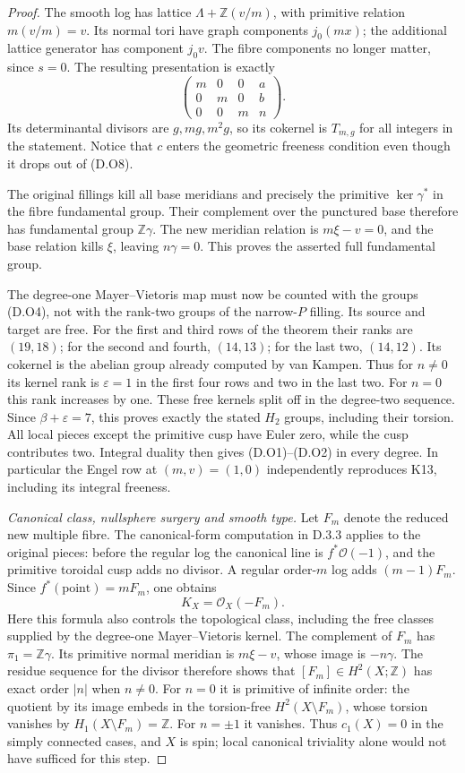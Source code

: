 \begin{proof}
The smooth log has lattice $\Lambda+\mathbb Z(v/m)$,
with primitive relation $m(v/m)=v$.
Its normal tori have graph components $j_0(mx)$;
the additional lattice generator has component $j_0v$.
The fibre components no longer matter, since $s=0$.
The resulting presentation is exactly
\[
  \begin{pmatrix}
    m&0&0&a\\0&m&0&b\\0&0&m&n
  \end{pmatrix}.
 \tag{D.O8}
\]
Its determinantal divisors are $g,mg,m^2g$,
so its cokernel is $T_{m,g}$ for all integers in the
statement. Notice that $c$ enters the geometric
freeness condition even though it drops out of (D.O8).

The original fillings kill all base meridians and
precisely the primitive $\ker\gamma^*$ in the fibre
fundamental group. Their complement over the punctured
base therefore has fundamental group $\mathbb Z\gamma$.
The new meridian relation is $m\xi-v=0$, and the base
relation kills $\xi$, leaving $n\gamma=0$. This proves
the asserted full fundamental group.

The degree-one Mayer--Vietoris map must now be counted
with the groups (D.O4), not with the rank-two groups of
the narrow-$P$ filling. Its source and target are free.
For the first and third rows of the theorem their ranks
are $(19,18)$; for the second and fourth, $(14,13)$;
for the last two, $(14,12)$.
Its cokernel is the abelian group already computed by
van Kampen. Thus for $n\ne0$ its kernel rank is
$\varepsilon=1$ in the first four rows and two in the
last two. For $n=0$ this rank increases by one.
These free kernels split off in the degree-two sequence.
Since $\beta+\varepsilon=7$, this proves exactly the
stated $H_2$ groups, including their torsion.
All local pieces except the primitive cusp have Euler
zero, while the cusp contributes two. Integral duality
then gives (D.O1)--(D.O2) in every degree. In particular
the Engel row at $(m,v)=(1,0)$ independently reproduces
K13, including its integral freeness.

\emph{Canonical class, nullsphere surgery and smooth type.}
Let $F_m$ denote the reduced new multiple fibre.
The canonical-form computation in D.3.3 applies to the
original pieces: before the regular log the canonical
line is $f^*\mathcal O(-1)$, and the primitive toroidal
cusp adds no divisor. A regular order-$m$ log adds
$(m-1)F_m$. Since $f^*(\mathrm{point})=mF_m$, one obtains
\[
                         K_X=\mathcal O_X(-F_m).
 \tag{D.O9}
\]
Here this formula also controls the topological class,
including the free classes supplied by the degree-one
Mayer--Vietoris kernel. The complement of $F_m$ has
$\pi_1=\mathbb Z\gamma$. Its primitive normal meridian
is $m\xi-v$, whose image is $-n\gamma$.
The residue sequence for the divisor therefore shows
that $[F_m]\in H^2(X;\mathbb Z)$ has exact order $|n|$
when $n\ne0$. For $n=0$ it is primitive of infinite
order: the quotient by its image embeds in the torsion-free
$H^2(X\setminus F_m)$, whose torsion vanishes by
$H_1(X\setminus F_m)=\mathbb Z$. For $n=\pm1$ it vanishes. Thus $c_1(X)=0$ in the
simply connected cases, and $X$ is spin; local canonical
triviality alone would not have sufficed for this step.


\end{proof}
